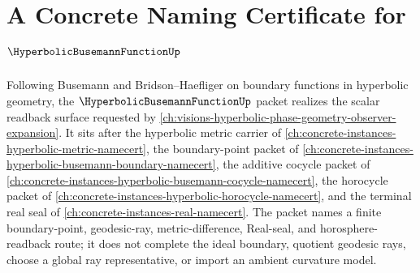 \chapter{A Concrete Naming Certificate for $\HyperbolicBusemannFunctionUp$}
\label{ch:concrete-instances-hyperbolic-busemann-function-namecert}

Following Busemann and Bridson--Haefliger on boundary functions in hyperbolic geometry, the $\HyperbolicBusemannFunctionUp$ packet realizes the scalar readback surface requested by \autoref{ch:visions-hyperbolic-phase-geometry-observer-expansion}. It sits after the hyperbolic metric carrier of \autoref{ch:concrete-instances-hyperbolic-metric-namecert}, the boundary-point packet of \autoref{ch:concrete-instances-hyperbolic-busemann-boundary-namecert}, the additive cocycle packet of \autoref{ch:concrete-instances-hyperbolic-busemann-cocycle-namecert}, the horocycle packet of \autoref{ch:concrete-instances-hyperbolic-horocycle-namecert}, and the terminal real seal of \autoref{ch:concrete-instances-real-namecert}. The packet names a finite boundary-point, geodesic-ray, metric-difference, Real-seal, and horosphere-readback route; it does not complete the ideal boundary, quotient geodesic rays, choose a global ray representative, or import an ambient curvature model.

